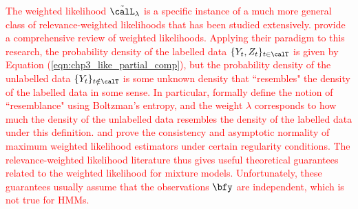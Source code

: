 \textcolor{red}{The weighted likelihood $\tilde \calL_\lambda$ is a specific instance of a much more general class of relevance-weighted likelihoods that has been studied extensively.  \citet{Hu:2002} provide a comprehensive review of weighted likelihoods. Applying their paradigm to this research, the probability density of the labelled data $\{Y_t,Z_t\}_{t \in \calT}$ is given by Equation (\ref{eqn:chp3_like_partial_comp}), but the probability density of the unlabelled data $\{Y_t\}_{t \notin \calT}$ is some unknown density that ``resembles" the density of the labelled data in some sense. In particular, \citet{Hu:2002} formally define the notion of ``resemblance" using Boltzman's entropy, and the weight $\lambda$ corresponds to how much the density of the unlabelled data resembles the density of the labelled data under this definition. \citet{Hu:1997} and \citet{Wang:2001} prove the consistency and asymptotic normality of maximum weighted likelihood estimators under certain regularity conditions. The relevance-weighted likelihood literature thus gives useful theoretical guarantees related to the weighted likelihood for mixture models. Unfortunately, these guarantees usually assume that the observations $\bfy$ are independent, which is not true for HMMs.}